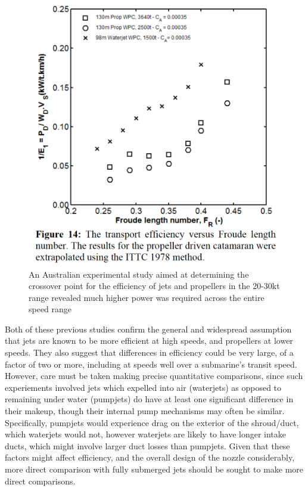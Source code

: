 \documentclass{article}\usepackage[]{graphicx}\usepackage[]{color}
\begin{document}
\begin{figure}
\includegraphics[width=\textwidth]{EfficiencyTransport.png}
\caption{An Australian experimental study aimed at determining the crossover point for the efficiency of jets and propellers in the 20-30kt range revealed much higher power was required across the entire speed range \parencite{kamal2015}}
\label{fig:EfficiencyTransport.png}
\end{figure}

Both of these previous studies confirm the general and widespread assumption that jets are known to be more efficient at high speeds, and propellers at lower speeds.  They also suggest that differences in efficiency could be very large, of a factor of two or more, including at speeds well over a submarine's transit speed.  However, care must be taken making precise quantitative comparisons, since such experiements involved jets which expelled into air (waterjets) as opposed to remaining under water (pumpjets) do have at least one significant difference in their makeup, though their internal pump mechanisms may often be similar. Specifically, pumpjets would experience drag on the exterior of the shroud/duct, which waterjets would not, however waterjets are likely to have longer intake ducts, which might involve larger duct losses than pumpjets.  Given that these factors might affect efficiency, and the overall design of the nozzle considerably, more direct comparison with fully submerged jets should be sought to make more direct comparisons.
\end{document}
